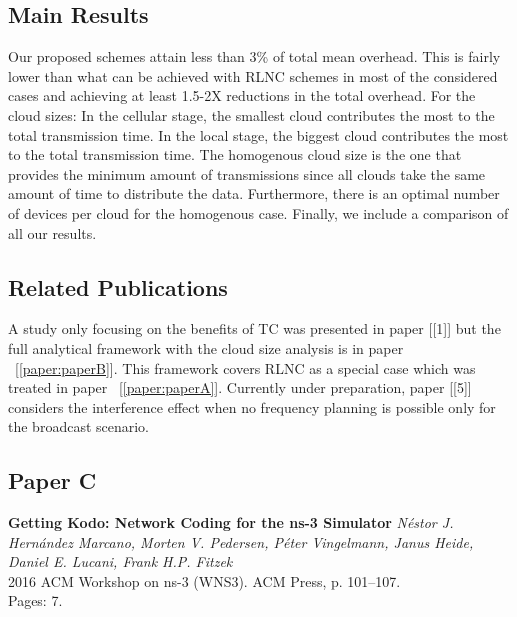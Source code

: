 \subsection*{Main Results}
Our proposed schemes attain less than 3\% of total mean overhead. This is fairly lower than what can be achieved with \ac{RLNC} schemes in most of the considered cases and achieving at least 1.5-2X reductions in the total overhead. For the cloud sizes: In the cellular stage, the smallest cloud contributes the most to the total transmission time. In the local stage, the biggest cloud contributes the most to the total transmission time. The homogenous cloud size is the one that provides the minimum amount of transmissions since all clouds take the same amount of time to distribute the data. Furthermore, there is an optimal number of devices per cloud for the homogenous case. Finally, we include a comparison of all our results. 

\subsection*{Related Publications}
A study only focusing on the benefits of \ac{TC} was presented in paper [{[1]}] but the full analytical framework with the cloud size analysis is in paper ~[\ref{paper:paperB}]. This framework covers \ac{RLNC} as a special case which was treated in paper ~[\ref{paper:paperA}]. Currently under preparation, paper [{[5]}] considers the interference effect when no frequency planning is possible only for the broadcast scenario. 

\clearpage

\subsection{Paper C}
\textbf{Getting Kodo: Network Coding for the ns-3 Simulator}
\textit{N\'estor J. Hern\'andez Marcano, Morten V. Pedersen, P\'eter
Vingelmann, Janus Heide, Daniel E. Lucani, Frank H.P. Fitzek}
\\ 2016 ACM Workshop on ns-3 (WNS3). ACM Press, p. 101--107.
\\ Pages: 7.
